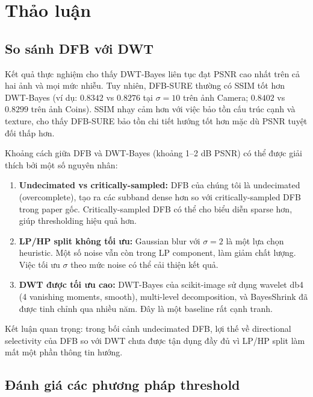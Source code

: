 \section{Thảo luận}
\label{sec:discussion}

\subsection{So sánh DFB với DWT}

Kết quả thực nghiệm cho thấy DWT-Bayes liên tục đạt PSNR cao nhất trên cả hai ảnh và mọi mức nhiễu. Tuy nhiên, DFB-SURE thường có SSIM tốt hơn DWT-Bayes (ví dụ: $0.8342$ vs $0.8276$ tại $\sigma = 10$ trên ảnh Camera; $0.8402$ vs $0.8299$ trên ảnh Coins). SSIM nhạy cảm hơn với việc bảo tồn cấu trúc cạnh và texture, cho thấy DFB-SURE bảo tồn chi tiết hướng tốt hơn mặc dù PSNR tuyệt đối thấp hơn.

Khoảng cách giữa DFB và DWT-Bayes (khoảng 1--2 dB PSNR) có thể được giải thích bởi một số nguyên nhân:

\begin{enumerate}
    \item \textbf{Undecimated vs critically-sampled:} DFB của chúng tôi là undecimated (overcomplete), tạo ra các subband dense hơn so với critically-sampled DFB trong paper gốc. Critically-sampled DFB có thể cho biểu diễn sparse hơn, giúp thresholding hiệu quả hơn.
    \item \textbf{LP/HP split không tối ưu:} Gaussian blur với $\sigma = 2$ là một lựa chọn heuristic. Một số noise vẫn còn trong LP component, làm giảm chất lượng. Việc tối ưu $\sigma$ theo mức noise có thể cải thiện kết quả.
    \item \textbf{DWT được tối ưu cao:} DWT-Bayes của scikit-image sử dụng wavelet db4 (4 vanishing moments, smooth), multi-level decomposition, và BayesShrink đã được tinh chỉnh qua nhiều năm. Đây là một baseline rất cạnh tranh.
\end{enumerate}

Kết luận quan trọng: trong bối cảnh undecimated DFB, lợi thế về directional selectivity của DFB so với DWT chưa được tận dụng đầy đủ vì LP/HP split làm mất một phần thông tin hướng.

\subsection{Đánh giá các phương pháp threshold}

